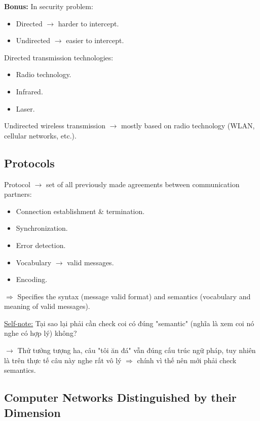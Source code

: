 \noindent
\textbf{Bonus:} In security problem:

\begin{itemize}
    \item Directed $\rightarrow$ harder to intercept.
    \item Undirected $\rightarrow$ easier to intercept.
\end{itemize}
\medskip

\noindent
Directed transmission technologies:

\begin{itemize}
    \item Radio technology.
    \item Infrared.
    \item Laser.
\end{itemize}

\noindent
Undirected wireless transmission $\rightarrow$ mostly based on radio technology (WLAN, cellular networks, etc.).
\medskip

\subsection{Protocols}

\noindent
Protocol $\rightarrow$ set of all previously made agreements between communication partners:

\begin{itemize}
    \item Connection establishment \& termination.
    \item Synchronization.
    \item Error detection.
    \item Vocabulary $\rightarrow$ valid messages.
    \item Encoding.
\end{itemize}

\noindent
$\Rightarrow$ Specifies the syntax (message valid format) and semantics (vocabulary and meaning of valid messages).
\medskip

\noindent
\underline{Self-note:} Tại sao lại phải cần check coi có đúng "semantic" (nghĩa là xem coi nó nghe có hợp lý) không? 

$\rightarrow$ Thử tưởng tượng ha, câu "tôi ăn đá" vẫn đúng cấu trúc ngữ pháp, tuy nhiên là trên thực tế câu này nghe rất vô lý $\Rightarrow$ chính vì thế nên mới phải check semantics.
\medskip

\subsection{Computer Networks Distinguished by their Dimension}

